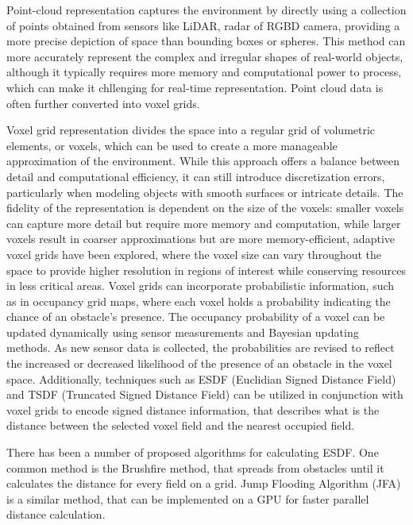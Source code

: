\documentclass[letterpaper, 10 pt, conference]{ieeeconf}  %
\begin{document}
Point-cloud representation captures the environment by directly using a collection of points obtained from sensors like LiDAR, radar of RGBD camera, providing a more precise depiction of space than bounding boxes or spheres. This method can more accurately represent the complex and irregular shapes of real-world objects, although it typically requires more memory and computational power to process, which can make it chllenging for real-time representation. Point cloud data is often further converted into voxel grids.

Voxel grid representation divides the space into a regular grid of volumetric elements, or voxels, which can be used to create a more manageable approximation of the environment. While this approach offers a balance between detail and computational efficiency, it can still introduce discretization errors, particularly when modeling objects with smooth surfaces or intricate details. The fidelity of the representation is dependent on the size of the voxels: smaller voxels can capture more detail but require more memory and computation, while larger voxels result in coarser approximations but are more memory-efficient, adaptive voxel grids have been explored, where the voxel size can vary throughout the space to provide higher resolution in regions of interest while conserving resources in less critical areas. Voxel grids can incorporate probabilistic information, such as in occupancy grid maps, where each voxel holds a probability indicating the chance of an obstacle's presence. The occupancy probability of a voxel can be updated dynamically using sensor measurements and Bayesian updating methods. As new sensor data is collected, the probabilities are revised to reflect the increased or decreased likelihood of the presence of an obstacle in the voxel space. Additionally, techniques such as ESDF (Euclidian Signed Distance Field) and TSDF (Truncated Signed Distance Field) can be utilized in conjunction with voxel grids to encode signed distance information, that describes what is the distance between the selected voxel field and the nearest occupied field.

There has been a number of proposed algorithms for calculating ESDF. One common method is the Brushfire method, that spreads from obstacles until it calculates the distance for every field on a grid.  Jump Flooding Algorithm (JFA) is a similar method, that can be implemented on a GPU for faster parallel distance calculation.  
 
\end{document}
